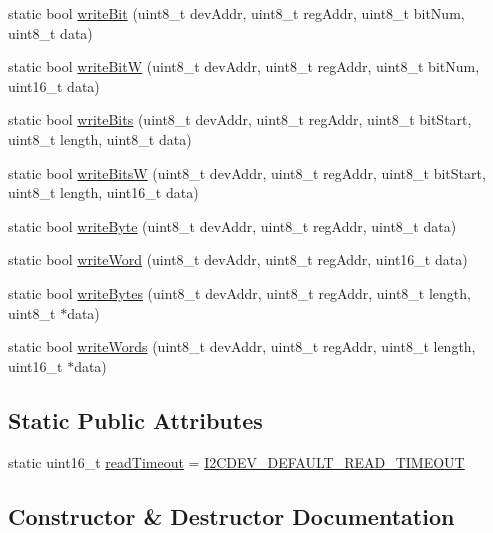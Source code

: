 \begin{DoxyCompactItemize}
\item 
static bool \hyperlink{classI2Cdev_aa68890af87de5471d32e583ebbd91acb}{write\+Bit} (uint8\+\_\+t dev\+Addr, uint8\+\_\+t reg\+Addr, uint8\+\_\+t bit\+Num, uint8\+\_\+t data)
\item 
static bool \hyperlink{classI2Cdev_a1b5fbedfadec5d429c81ee84d27e658d}{write\+BitW} (uint8\+\_\+t dev\+Addr, uint8\+\_\+t reg\+Addr, uint8\+\_\+t bit\+Num, uint16\+\_\+t data)
\item 
static bool \hyperlink{classI2Cdev_a913371251b6a41520c080115650e1b59}{write\+Bits} (uint8\+\_\+t dev\+Addr, uint8\+\_\+t reg\+Addr, uint8\+\_\+t bit\+Start, uint8\+\_\+t length, uint8\+\_\+t data)
\item 
static bool \hyperlink{classI2Cdev_a8f8652a1328224cce867eed665a45c4d}{write\+BitsW} (uint8\+\_\+t dev\+Addr, uint8\+\_\+t reg\+Addr, uint8\+\_\+t bit\+Start, uint8\+\_\+t length, uint16\+\_\+t data)
\item 
static bool \hyperlink{classI2Cdev_aeb297637ef985cd562da465ba61b7042}{write\+Byte} (uint8\+\_\+t dev\+Addr, uint8\+\_\+t reg\+Addr, uint8\+\_\+t data)
\item 
static bool \hyperlink{classI2Cdev_acbe68a802d6a177301736e60bedd1def}{write\+Word} (uint8\+\_\+t dev\+Addr, uint8\+\_\+t reg\+Addr, uint16\+\_\+t data)
\item 
static bool \hyperlink{classI2Cdev_aa4e39cac6c0eac5112f9132084bcc93e}{write\+Bytes} (uint8\+\_\+t dev\+Addr, uint8\+\_\+t reg\+Addr, uint8\+\_\+t length, uint8\+\_\+t $\ast$data)
\item 
static bool \hyperlink{classI2Cdev_aae37c0526e4b4730a5b2ffd752fd8b21}{write\+Words} (uint8\+\_\+t dev\+Addr, uint8\+\_\+t reg\+Addr, uint8\+\_\+t length, uint16\+\_\+t $\ast$data)
\end{DoxyCompactItemize}
\subsection*{Static Public Attributes}
\begin{DoxyCompactItemize}
\item 
static uint16\+\_\+t \hyperlink{classI2Cdev_ae2125796e0948127fc15031650111e82}{read\+Timeout} = \hyperlink{I2Cdev_8h_ad9726bb02451bb8f59d3d2729e4cd20e}{I2\+C\+D\+E\+V\+\_\+\+D\+E\+F\+A\+U\+L\+T\+\_\+\+R\+E\+A\+D\+\_\+\+T\+I\+M\+E\+O\+UT}
\end{DoxyCompactItemize}


\subsection{Constructor \& Destructor Documentation}
